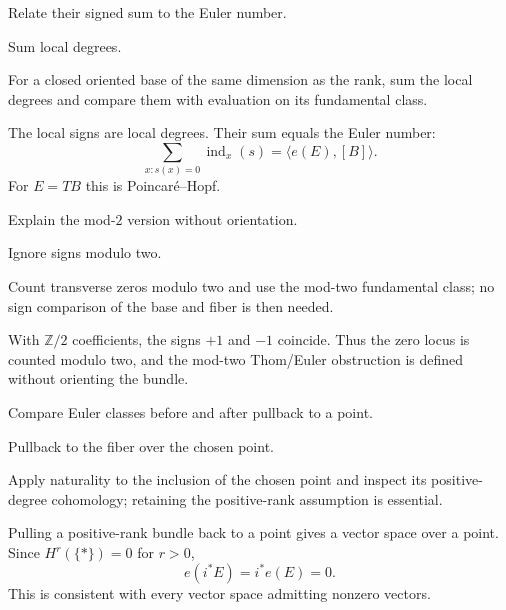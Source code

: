 \begin{exercise}\label{exr:viii32-15}
Relate their signed sum to the Euler number.
\end{exercise}
\begin{hint}
Sum local degrees.

For a closed oriented base of the same dimension as the rank, sum the local degrees and compare them with evaluation on its fundamental class.
\end{hint}
\begin{solution}
The local signs are local degrees. Their sum equals the Euler number:
\[
\sum_{x:s(x)=0}\operatorname{ind}_x(s)
=\langle e(E),[B]\rangle.
\]
For \(E=TB\) this is Poincaré--Hopf.
\end{solution}

\begin{exercise}\label{exr:viii32-16}
Explain the mod-$2$ version without orientation.
\end{exercise}
\begin{hint}
Ignore signs modulo two.

Count transverse zeros modulo two and use the mod-two fundamental class; no sign comparison of the base and fiber is then needed.
\end{hint}
\begin{solution}
With \(\mathbb Z/2\) coefficients, the signs \(+1\) and \(-1\) coincide. Thus the zero locus is counted modulo two, and the mod-two Thom/Euler obstruction is defined without orienting the bundle.
\end{solution}

\begin{exercise}\label{exr:viii32-17}
Compare Euler classes before and after pullback to a point.
\end{exercise}
\begin{hint}
Pullback to the fiber over the chosen point.

Apply naturality to the inclusion of the chosen point and inspect its positive-degree cohomology; retaining the positive-rank assumption is essential.
\end{hint}
\begin{solution}
Pulling a positive-rank bundle back to a point gives a vector space over a point. Since \(H^r(\{\ast\})=0\) for \(r>0\),
\[
e(i^*E)=i^*e(E)=0.
\]
This is consistent with every vector space admitting nonzero vectors.
\end{solution}

